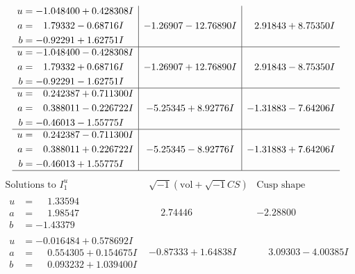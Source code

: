 \documentclass[1p]{elsarticle_modified}
\theoremstyle{definition}
\newcommand{\I}{\sqrt{-1}}
\begin{document}
$$\begin{array}{c|c|c}
\begin{aligned}
u &= -1.048400 + 0.428308 I \\
a &= \phantom{-}1.79332 - 0.68716 I \\
b &= -0.92291 + 1.62751 I\end{aligned}
 & -1.26907 - 12.76890 I & \phantom{-}2.91843 + 8.75350 I \\ \hline\begin{aligned}
u &= -1.048400 - 0.428308 I \\
a &= \phantom{-}1.79332 + 0.68716 I \\
b &= -0.92291 - 1.62751 I\end{aligned}
 & -1.26907 + 12.76890 I & \phantom{-}2.91843 - 8.75350 I \\ \hline\begin{aligned}
u &= \phantom{-}0.242387 + 0.711300 I \\
a &= \phantom{-}0.388011 - 0.226722 I \\
b &= -0.46013 - 1.55775 I\end{aligned}
 & -5.25345 + 8.92776 I & -1.31883 - 7.64206 I \\ \hline\begin{aligned}
u &= \phantom{-}0.242387 - 0.711300 I \\
a &= \phantom{-}0.388011 + 0.226722 I \\
b &= -0.46013 + 1.55775 I\end{aligned}
 & -5.25345 - 8.92776 I & -1.31883 + 7.64206 I\\
 \hline 
 \end{array}$$\newpage$$\begin{array}{c|c|c}  
\text{Solutions to }I^u_{1}& \I (\text{vol} + \sqrt{-1}CS) & \text{Cusp shape}\\
 \hline 
\begin{aligned}
u &= \phantom{-}1.33594\phantom{ +0.000000I} \\
a &= \phantom{-}1.98547\phantom{ +0.000000I} \\
b &= -1.43379\phantom{ +0.000000I}\end{aligned}
 & \phantom{-}2.74446\phantom{ +0.000000I} & -2.28800\phantom{ +0.000000I} \\ \hline\begin{aligned}
u &= -0.016484 + 0.578692 I \\
a &= \phantom{-}0.554305 + 0.154675 I \\
b &= \phantom{-}0.093232 + 1.039400 I\end{aligned}
 & -0.87333 + 1.64838 I & \phantom{-}3.09303 - 4.00385 I \\ \hline\begin{aligned}

\end{aligned}
\end{array}$$
\end{document}
